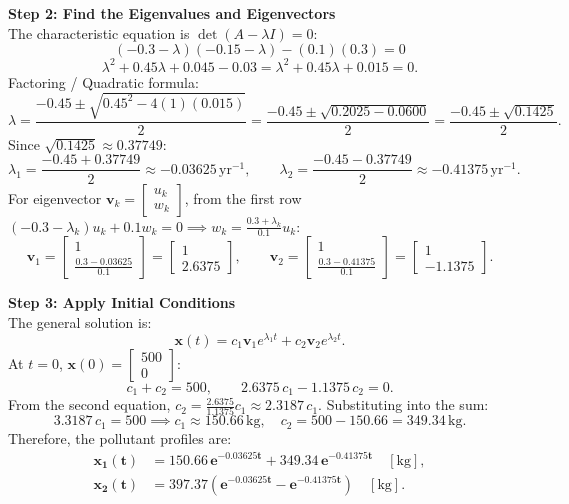 \documentclass[12pt]{article}
\begin{document}
\begin{examplebox*}
\textbf{Step 2: Find the Eigenvalues and Eigenvectors}\\
The characteristic equation is $\det(A - \lambda I) = 0$:
\[
  (-0.3 - \lambda)(-0.15 - \lambda) - (0.1)(0.3) = 0
\]
\[
  \lambda^2 + 0.45\lambda + 0.045 - 0.03 = \lambda^2 + 0.45\lambda + 0.015 = 0.
\]
Factoring / Quadratic formula:
\[
  \lambda = \frac{-0.45 \pm \sqrt{0.45^2 - 4(1)(0.015)}}{2} = \frac{-0.45 \pm \sqrt{0.2025 - 0.0600}}{2} = \frac{-0.45 \pm \sqrt{0.1425}}{2}.
\]
Since $\sqrt{0.1425} \approx 0.37749$:
\[
  \lambda_1 = \frac{-0.45 + 0.37749}{2} \approx -0.03625\,\text{yr}^{-1}, \qquad
  \lambda_2 = \frac{-0.45 - 0.37749}{2} \approx -0.41375\,\text{yr}^{-1}.
\]
For eigenvector $\mathbf{v}_k = \begin{bmatrix} u_k \\ w_k \end{bmatrix}$, from the first row $(-0.3 - \lambda_k)u_k + 0.1 w_k = 0 \implies w_k = \frac{0.3 + \lambda_k}{0.1}u_k$:
\[
  \mathbf{v}_1 = \begin{bmatrix} 1 \\ \frac{0.3 - 0.03625}{0.1} \end{bmatrix} = \begin{bmatrix} 1 \\ 2.6375 \end{bmatrix}, \qquad
  \mathbf{v}_2 = \begin{bmatrix} 1 \\ \frac{0.3 - 0.41375}{0.1} \end{bmatrix} = \begin{bmatrix} 1 \\ -1.1375 \end{bmatrix}.
\]

\textbf{Step 3: Apply Initial Conditions}\\
The general solution is:
\[
  \mathbf{x}(t) = c_1 \mathbf{v}_1 e^{\lambda_1 t} + c_2 \mathbf{v}_2 e^{\lambda_2 t}.
\]
At $t = 0$, $\mathbf{x}(0) = \begin{bmatrix} 500 \\ 0 \end{bmatrix}$:
\[
  c_1 + c_2 = 500, \qquad 2.6375\,c_1 - 1.1375\,c_2 = 0.
\]
From the second equation, $c_2 = \frac{2.6375}{1.1375}c_1 \approx 2.3187\,c_1$.
Substituting into the sum:
\[
  3.3187\,c_1 = 500 \implies c_1 \approx 150.66\,\text{kg}, \quad c_2 = 500 - 150.66 = 349.34\,\text{kg}.
\]
Therefore, the pollutant profiles are:
\begin{align*}
  \mathbf{x_1(t)} &= \mathbf{150.66\,e^{-0.03625 t} + 349.34\,e^{-0.41375 t}} \quad [\text{kg}],\\
  \mathbf{x_2(t)} &= \mathbf{397.37\left(e^{-0.03625 t} - e^{-0.41375 t}\right)} \quad [\text{kg}].
\end{align*}


\end{examplebox*}
\end{document}
